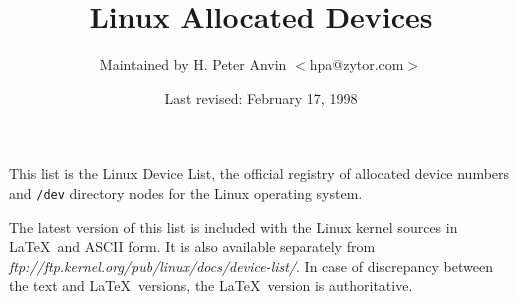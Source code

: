 %
%
%
\oddsidemargin=0in
\textwidth=6.5in
\topmargin=0in
\headheight=0.5in
\headsep=0.25in
\textheight=7.5in
\footskip=0.75in
\footheight=0.5in
%

\newcommand{\file}{\tt}			%
\newcommand{\url}{\it}		        %
\newcommand{\hex}{\tt}			%
\newcommand{\ud}{(Under development)}	%
\newcommand{\1}{\({}^1\)}
\newcommand{\2}{\({}^2\)}
\newcommand{\3}{\({}^3\)}
\newcommand{\4}{\({}^4\)}
\newlength{\dig}
\settowidth{\dig}{0}			%
\newcommand{\num}[2]{\makebox[#1\dig][r]{#2}}
\newcommand{\major}[4]{\num{3}{#1}#2 \> #3 \> #4 \\}
\newcommand{\minor}[3]{\> \> \num{3}{#1} \> {\file #2} \> #3 \\}
\newcommand{\minordots}{\> \> \> \dots \\}
\newenvironment{devicelist}%
 {\begin{tabbing}%
000--000 \= blockxxx \= 000 \= {\file /dev/crambamboli} \= foo \kill}%
 {\end{tabbing}}
\newcommand{\link}[4]{{\file #1} \> {\file #2} \> #3 \> #4 \\}
\newcommand{\vlink}[4]{{\file #1} \> {\em #2 \/} \> #3 \> #4 \\}
\newcommand{\node}[3]{{\file #1} \> #2 \> #3 \\}
\newcommand{\tum}{$''$}
\newenvironment{nodelist}%
 {\begin{tabbing}%
{\file /dev/crambamboli} \= {\file /proc/self/fd/99} \= symbolicxxx \=
foo \kill}%
 {\end{tabbing}}
%
%
\title{{\bf Linux Allocated Devices}}
\author{Maintained by H. Peter Anvin $<$hpa@zytor.com$>$}
\date{Last revised: February 17, 1998}
\maketitle
%
\noindent
This list is the Linux Device List, the official registry of allocated
device numbers and {\file /dev} directory nodes for the Linux
operating system.

The latest version of this list is included with the Linux kernel
sources in \LaTeX\ and ASCII form.  It is also available separately
from {\url ftp://ftp.kernel.org/pub/linux/docs/device-list/}.  In case
of discrepancy between the text and \LaTeX\ versions, the \LaTeX\
version is authoritative.

